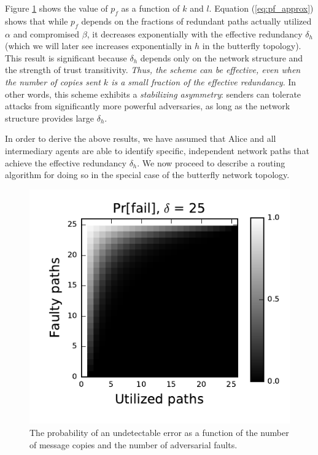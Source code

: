 \documentclass[sigconf]{acmart}
\begin{document}
Figure \ref{fig:pfail} shows the value of $p_f$
as a function of $k$ and $l$.
Equation (\ref{eq:pf_approx}) shows that while $p_f$
depends on the fractions of
redundant paths actually utilized $\alpha$ and compromised $\beta$,
it decreases exponentially with the effective redundancy $\delta_h$
(which we will later see increases exponentially in $h$ in the
butterfly topology).
This result is significant because $\delta_h$
depends only on the network structure
and the strength of trust transitivity.
{\em Thus, the scheme can be effective, even when the number of copies
sent $k$ is a small fraction of the effective redundancy}.
In other words, this scheme exhibits a {\em stabilizing asymmetry}:
senders can tolerate attacks from significantly more powerful
adversaries,
as long as the network structure provides large $\delta_h$.

In order to derive the above results,
we have assumed that Alice and all
intermediary agents are able to identify specific,
independent network paths that achieve the effective redundancy $\delta_h$.
We now proceed to describe a routing algorithm for doing so in the special case
of the butterfly network topology.

\begin{figure}
\centerline{\includegraphics{fig-perror}}
\caption{
The probability of an undetectable error as a function of the number of
message copies and the number of adversarial faults.
}
\label{fig:pfail}
\end{figure}
\end{document}
